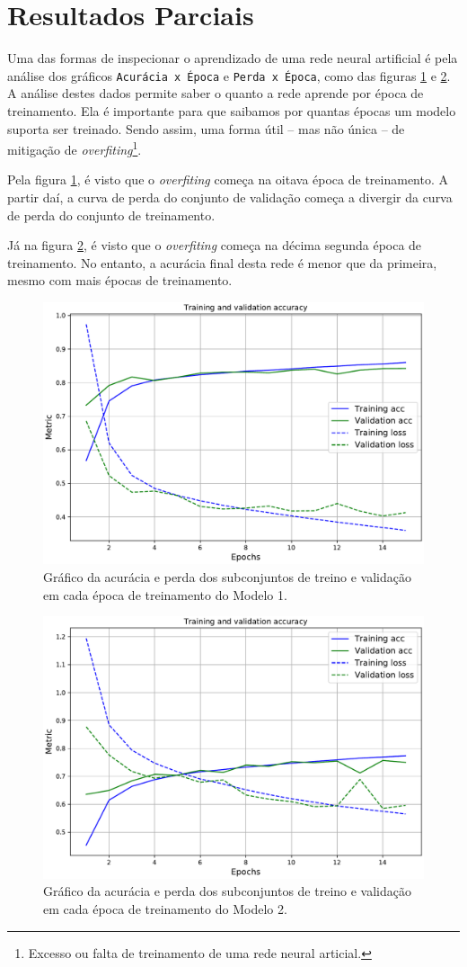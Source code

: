 \section{Resultados Parciais}
Uma das formas de inspecionar o aprendizado de uma rede neural artificial é pela análise dos gráficos \texttt{Acurácia x Época} e \texttt{Perda x Época}, como das figuras \ref{fig:conv_train} e \ref{fig:pretrained_train}. A análise destes dados permite saber o quanto a rede aprende por época de treinamento. Ela é importante para que saibamos por quantas épocas um modelo suporta ser treinado. Sendo assim, uma forma útil -- mas não única -- de mitigação de \emph{overfiting}\footnote{Excesso ou falta de treinamento de uma rede neural articial.}.

Pela figura \ref{fig:conv_train}, é visto que o \emph{overfiting} começa na oitava época de treinamento. A partir daí, a curva de perda do conjunto de validação começa a divergir da curva de perda do conjunto de treinamento.

Já na figura \ref{fig:pretrained_train}, é visto que o \emph{overfiting} começa na décima segunda época de treinamento. No entanto, a acurácia final desta rede é menor que da primeira, mesmo com mais épocas de treinamento.

\begin{figure}[h!]
  \centering
  \includegraphics[width=.79\textwidth]{figures/conv_train.pdf}
  \caption{Gráfico da acurácia e perda dos subconjuntos de treino e validação em cada época de treinamento do Modelo 1.}
  \label{fig:conv_train}
\end{figure}

\begin{figure}[h!]
  \centering
  \includegraphics[width=.79\textwidth]{figures/pretrained_train.pdf}
  \caption{Gráfico da acurácia e perda dos subconjuntos de treino e validação em cada época de treinamento do Modelo 2.}
  \label{fig:pretrained_train}
\end{figure}
\pagebreak